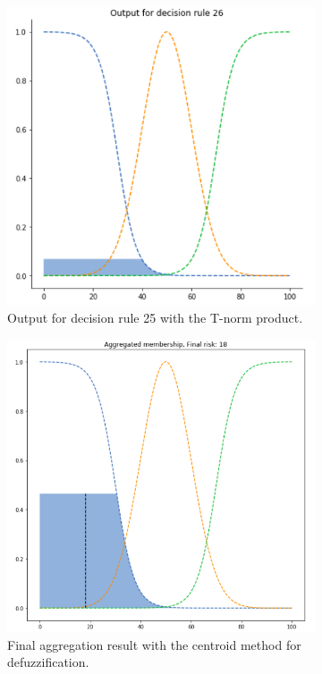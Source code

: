 \begin{figure}[ht]
\begin{subfigure}{.5\textwidth}
  \centering
  \includegraphics[width=.8\linewidth]{figures/first/prod3.png}  
  \caption{Output for decision rule 25 with the T-norm product.}
  \label{fig:1prod3}
\end{subfigure}
\begin{subfigure}{.5\textwidth}
  \centering
  \includegraphics[width=.8\linewidth]{figures/first/prod-centroid.png}  
  \caption{Final aggregation result with the centroid method for defuzzification.}
  \label{fig:1prod-centroid}
\end{subfigure}
\begin{subfigure}{.5\textwidth}

\end{subfigure}
\end{figure}
